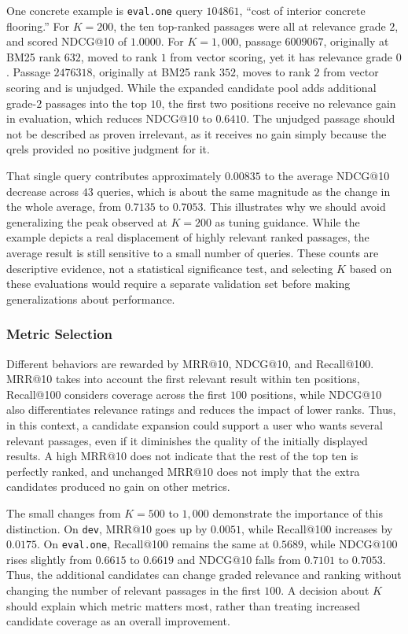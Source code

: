 \documentclass[11pt]{article}
\begin{document}
One concrete example is \texttt{eval.one} query $104861$, ``cost of interior concrete flooring.'' For $K=200$, the ten top-ranked passages were all at relevance grade $2$, and scored NDCG@10 of $1.0000$. For $K=1{,}000$, passage $6009067$, originally at BM25 rank $632$, moved to rank $1$ from vector scoring, yet it has relevance grade $0$. Passage $2476318$, originally at BM25 rank $352$, moves to rank $2$ from vector scoring and is unjudged. While the expanded candidate pool adds additional grade-$2$ passages into the top $10$, the first two positions receive no relevance gain in evaluation, which reduces NDCG@10 to $0.6410$. The unjudged passage should not be described as proven irrelevant, as it receives no gain simply because the qrels provided no positive judgment for it.

That single query contributes approximately $0.00835$ to the average NDCG@10 decrease across $43$ queries, which is about the same magnitude as the change in the whole average, from $0.7135$ to $0.7053$. This illustrates why we should avoid generalizing the peak observed at $K=200$ as tuning guidance. While the example depicts a real displacement of highly relevant ranked passages, the average result is still sensitive to a small number of queries. These counts are descriptive evidence, not a statistical significance test, and selecting $K$ based on these evaluations would require a separate validation set before making generalizations about performance.

\subsubsection{Metric Selection}
Different behaviors are rewarded by MRR@10, NDCG@10, and Recall@100. MRR@10 takes into account the first relevant result within ten positions, Recall@100 considers coverage across the first $100$ positions, while NDCG@10 also differentiates relevance ratings and reduces the impact of lower ranks. Thus, in this context, a candidate expansion could support a user who wants several relevant passages, even if it diminishes the quality of the initially displayed results. A high MRR@10 does not indicate that the rest of the top ten is perfectly ranked, and unchanged MRR@10 does not imply that the extra candidates produced no gain on other metrics.

The small changes from $K=500$ to $1{,}000$ demonstrate the importance of this distinction. On \texttt{dev}, MRR@10 goes up by $0.0051$, while Recall@100 increases by $0.0175$. On \texttt{eval.one}, Recall@100 remains the same at $0.5689$, while NDCG@100 rises slightly from $0.6615$ to $0.6619$ and NDCG@10 falls from $0.7101$ to $0.7053$. Thus, the additional candidates can change graded relevance and ranking without changing the number of relevant passages in the first $100$. A decision about $K$ should explain which metric matters most, rather than treating increased candidate coverage as an overall improvement.
\end{document}
